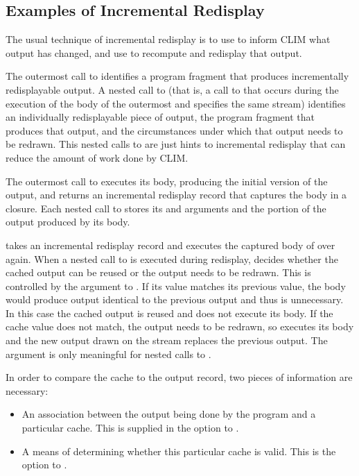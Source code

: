 \subsection {Examples of Incremental Redisplay}

The usual technique of incremental redisplay is to use  to
inform CLIM what output has changed, and use  to recompute and
redisplay that output.

The outermost call to  identifies a program fragment that
produces incrementally redisplayable output.  A nested call to
 (that is, a call to  that occurs during
the execution of the body of the outermost  and specifies
the same stream) identifies an individually redisplayable piece of output, the
program fragment that produces that output, and the circumstances under which
that output needs to be redrawn.  This nested calls to  are
just hints to incremental redisplay that can reduce the amount of work done by
CLIM.

The outermost call to  executes its body, producing the
initial version of the output, and returns an incremental redisplay record that
captures the body in a closure.  Each nested call to  stores
its  and  arguments and the portion of the
output produced by its body.

 takes an incremental redisplay record and executes the captured
body of  over again.  When a nested call to
 is executed during redisplay,  decides
whether the cached output can be reused or the output needs to be redrawn.  This
is controlled by the  argument to .  If its
value matches its previous value, the body would produce output identical to the
previous output and thus is unnecessary.  In this case the cached output is
reused and  does not execute its body.  If the cache value
does not match, the output needs to be redrawn, so  executes
its body and the new output drawn on the stream replaces the previous output.
The  argument is only meaningful for nested calls to
.

In order to compare the cache to the output record, two pieces of information
are necessary:

\begin{itemize}
\item An association between the output being done by the program and a
particular cache.  This is supplied in the  option to
.

\item A means of determining whether this particular cache is valid.  This is
the  option to .
\end{itemize}

